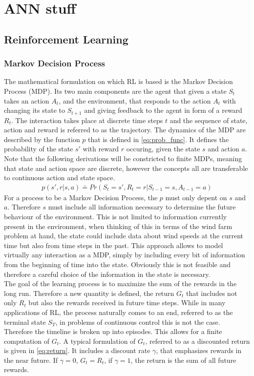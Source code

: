 \chapter{ANN stuff}
\section{Reinforcement Learning}
\subsection{Markov Decision Process}
The mathematical formulation on which RL is based is the Markov Decision Process (MDP). Its two main components are the agent that given a state $S_t$ takes an action $A_t$, and the environment, that responds to the action $A_t$ with changing its state to $S_{t+1}$ and giving feedback to the agent in form of a reward $R_t$. The interaction takes place at discrete time steps $t$ and the sequence of state, action and reward is referred to as the trajectory. The dynamics of the MDP are described by the function $p$ that is defined in \eqref{eq:prob_func}. It defines the probability of the state $s'$ with reward $r$ occuring, given the state $s$ and action $a$. Note that the following derivations will be constricted to finite MDPs, meaning that state and action space are discrete, however the concepts all are transferable to continuous action and state space.
\begin{align}
	p(s',r \vert s,a) \doteq Pr(S_t=s', R_t=r \vert S_{t-1} = s, A_{t-1} = a) \label{eq:prob_func}
\end{align}
For a process to be a Markov Decision Process, the $p$ must only depent on $s$ and $a$. Therefore $s$ must include all information necessary to determine the future behaviour of the environment. This is not limited to information currently present in the environment, when thinking of this in terms of the wind farm problem at hand, the state could include data about wind speeds at the current time but also from time steps in the past. This approach allows to model virtually any interaction as a MDP, simply by including every bit of information from the beginning of time into the state. Obviously this is not feasible and therefore a careful choice of the information in the state is necessary. \\
The goal of the learning process is to maximize the sum of the rewards in the long run. Therefore a new quantity is defined, the return $G_t$ that includes not only $R_t$ but also the rewards received in future time steps. While in many applications of RL, the process naturally comes to an end, referred to as the terminal state $S_T$, in problems of continuous control this is not the case. Therefore the timeline is broken up into episodes. This allows for a finite computation of $G_t$. A typical formulation of $G_t$, referred to as a discounted return is given in \eqref{eq:return}. It includes a discount rate $\gamma$, that emphasizes rewards in the near future. If $\gamma = 0$, $G_t = R_t$, if $\gamma = 1$, the return is the sum of all future rewards. \cite[p. 47- 57]{sutton_reinforcement_2018}
